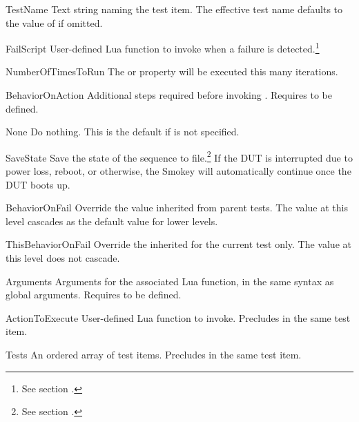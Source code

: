 \begin{Property}

	\item[TestName] Text string naming the test item.  The effective test
	name defaults to the value of  if omitted.

	\item[FailScript] User-defined Lua function to invoke when a failure is
	detected.\footnote{See section
	.\label{fn:SeqFun}}

	\item[NumberOfTimesToRun] The  or 
	property will be executed this many iterations.

	\item[BehaviorOnAction] Additional steps required before invoking
	.  Requires  to be defined.

	\begin{Definition}

		\item[None] Do nothing.  This is the default if
		 is not specified.

		\item[SaveState] Save the state of the sequence to
		file.\footnote{See section .}  If
		the DUT is interrupted due to power loss, reboot, or otherwise,
		the Smokey will automatically continue once the DUT boots up.

	\end{Definition}

	\item[BehaviorOnFail] Override the  value
	inherited from parent tests.  The value at this level cascades as the
	default value for lower levels.

	\item[ThisBehaviorOnFail] Override the inherited 
	for the current test only.  The value at this level does not cascade.

	\item[Arguments] Arguments for the associated Lua function, in the same
	syntax as global arguments.  Requires
	 to be defined.

	\item[ActionToExecute] User-defined Lua function to
	invoke.  Precludes  in the same test
	item.

	\item[Tests] An ordered array of test items.  Precludes
	 in the same test item.

\end{Property}

